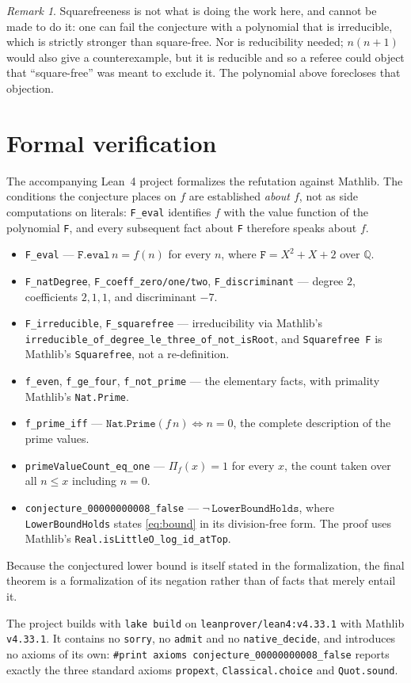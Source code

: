 \documentclass[11pt]{article}
\theoremstyle{plain}
\theoremstyle{remark}
\newtheorem{remark}[theorem]{Remark}
\begin{document}
\begin{remark}
Squarefreeness is not what is doing the work here, and cannot be made to do it:
one can fail the conjecture with a polynomial that is irreducible, which is
strictly stronger than square-free. Nor is reducibility needed; $n(n+1)$ would
also give a counterexample, but it is reducible and so a referee could object
that ``square-free'' was meant to exclude it. The polynomial above forecloses
that objection.
\end{remark}

\section{Formal verification}

The accompanying Lean~4 project formalizes the refutation against Mathlib. The
conditions the conjecture places on $f$ are established \emph{about $f$}, not
as side computations on literals: \texttt{F\_eval} identifies $f$ with the
value function of the polynomial \texttt{F}, and every subsequent fact about
\texttt{F} therefore speaks about $f$.

\begin{itemize}
  \item \texttt{F\_eval} --- $\texttt{F.eval}\,n=f(n)$ for every $n$, where
    $\texttt{F}=X^2+X+2$ over $\mathbb Q$.
  \item \texttt{F\_natDegree}, \texttt{F\_coeff\_zero/one/two},
    \texttt{F\_discriminant} --- degree $2$, coefficients $2,1,1$, and
    discriminant $-7$.
  \item \texttt{F\_irreducible}, \texttt{F\_squarefree} --- irreducibility via
    Mathlib's \texttt{irreducible\_of\_degree\_le\_three\_of\_not\_isRoot},
    and \texttt{Squarefree F} is Mathlib's \texttt{Squarefree}, not a
    re-definition.
  \item \texttt{f\_even}, \texttt{f\_ge\_four}, \texttt{f\_not\_prime} --- the
    elementary facts, with primality Mathlib's \texttt{Nat.Prime}.
  \item \texttt{f\_prime\_iff} --- $\texttt{Nat.Prime}(f\,n)\iff n=0$, the
    complete description of the prime values.
  \item \texttt{primeValueCount\_eq\_one} --- $\Pi_f(x)=1$ for every $x$, the
    count taken over all $n\le x$ including $n=0$.
  \item \texttt{conjecture\_00000000008\_false} ---
    $\lnot\,\texttt{LowerBoundHolds}$, where \texttt{LowerBoundHolds} states
    \eqref{eq:bound} in its division-free form. The proof uses Mathlib's
    \texttt{Real.isLittleO\_log\_id\_atTop}.
\end{itemize}

Because the conjectured lower bound is itself stated in the formalization, the
final theorem is a formalization of its negation rather than of facts that
merely entail it.

The project builds with \texttt{lake build} on
\texttt{leanprover/lean4:v4.33.1} with Mathlib \texttt{v4.33.1}. It contains no
\texttt{sorry}, no \texttt{admit} and no \texttt{native\_decide}, and
introduces no axioms of its own:
\texttt{\#print axioms conjecture\_00000000008\_false} reports exactly the
three standard axioms \texttt{propext}, \texttt{Classical.choice} and
\texttt{Quot.sound}.
\end{document}
